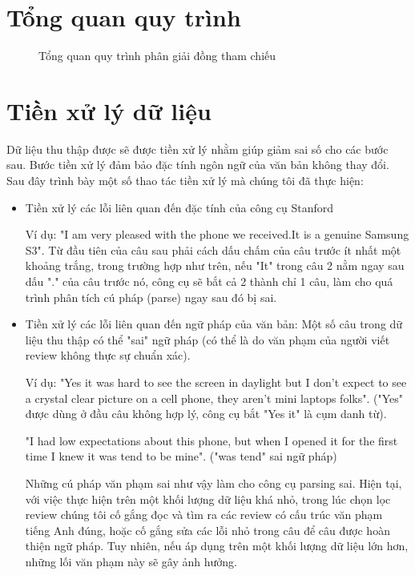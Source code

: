 \documentclass[12pt]{report}
\begin{document}
		\section{Tổng quan quy trình}
			\begin{figure}[H] 
				\centering				
				\resizebox{160mm}{!}{}
				\caption{Tổng quan quy trình phân giải đồng tham chiếu}							
			\end{figure}			
		\section{Tiền xử lý dữ liệu}
		\par Dữ liệu thu thập được sẽ được tiền xử lý nhằm giúp giảm sai số cho các bước sau. Bước tiền xử lý đảm bảo đặc tính ngôn ngữ của văn bản không thay đổi. Sau đây trình bày một số thao tác tiền xử lý mà chúng tôi đã thực hiện:
		\begin{itemize}
			\item{Tiền xử lý các lỗi liên quan đến đặc tính của công cụ Stanford
				\par Ví dụ: "I am very pleased with the phone we received.It is a genuine Samsung S3". Từ đầu tiên của câu sau phải cách dấu chấm của câu trước ít nhất một khoảng trắng, trong trường hợp như trên, nếu "It" trong câu 2 nằm ngay sau dấu "." của câu trước nó, công cụ sẽ bắt cả 2 thành chỉ 1 câu, làm cho quá trình phân tích cú pháp (parse) ngay sau đó bị sai.}
			\item{Tiền xử lý các lỗi liên quan đến ngữ pháp của văn bản: Một số câu trong dữ liệu thu thập có thể "sai" ngữ pháp (có thể là do văn phạm của người viết review không thực sự chuẩn xác). 
				\par Ví dụ: "Yes it was hard to see the screen in daylight but I don't expect to see a crystal clear picture on a cell phone, they aren't mini laptops folks". ("Yes" được dùng ở đầu câu không hợp lý, công cụ bắt "Yes it" là cụm danh từ).			
				\par "I had low expectations about this phone, but when I opened it for the first time I knew it was tend to be mine". ("was tend" sai ngữ pháp)
				\par Những cú pháp văn phạm sai như vậy làm cho công cụ parsing sai. Hiện tại, với việc thực hiện trên một khối lượng dữ liệu khá nhỏ, trong lúc chọn lọc review chúng tôi cố gắng đọc và tìm ra các review có cấu trúc văn phạm tiếng Anh đúng, hoặc cố gắng sửa các lỗi nhỏ trong câu để câu được hoàn thiện ngữ pháp. Tuy nhiên, nếu áp dụng trên một khối lượng dữ liệu lớn hơn, những lối văn phạm này sẽ gây ảnh hưởng.} 
		\end{itemize}
\end{document}
